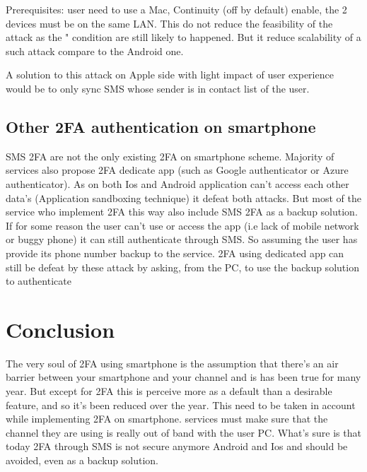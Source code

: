\documentclass[11pt, a4paper,twocolumn]{article}
\begin{document}
Prerequisites: user need to use a Mac, Continuity (off by default) enable, the 2 devices must be on the same LAN. This do not reduce the feasibility of the attack as the " condition are still likely to happened. But it reduce scalability of a such attack compare to the Android one.

A solution to this attack on Apple side with light impact of user experience would be to only sync SMS whose sender is in contact list of the user.

\subsection{Other 2FA authentication on smartphone}
SMS 2FA are not the only existing 2FA on smartphone scheme. Majority of services also propose 2FA dedicate app (such as Google authenticator or Azure authenticator). As on both Ios and Android application can't access each other data's (Application sandboxing technique) it defeat both attacks. But most of the service who implement 2FA this way also include SMS 2FA as a backup solution. If for some reason the user can't use or access the app (i.e lack of mobile network or buggy phone) it can still authenticate through SMS. So assuming the user has provide its phone number backup to the service. 2FA using dedicated app can still be defeat by these attack by asking, from the PC, to use the backup solution to authenticate


\section{Conclusion}

The very soul of 2FA using smartphone is the assumption that there's an air barrier between your smartphone and your channel and is has been true for many year. But except for 2FA this is perceive more as a default than a desirable feature, and so it's been reduced over the year. This need to be taken in account while implementing 2FA on smartphone. services must make sure that the channel they are using is really out of band with the user PC. What's sure is that today 2FA through SMS is not secure anymore Android and Ios and should be avoided, even as a backup solution.

\clearpage
 

\end{document}
